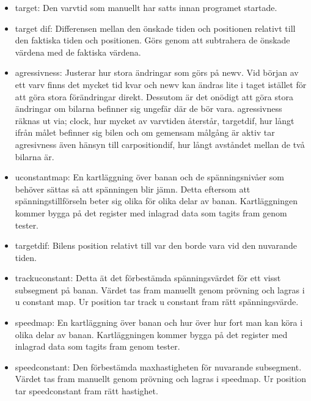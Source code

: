 \begin{itemize}
      \item target: Den varvtid som manuellt har satts innan programet startade.
      \item target dif: Differensen mellan den önskade tiden och positionen relativt till den faktiska tiden och positionen. Görs genom att subtrahera de önskade värdena med de faktiska värdena. 
 
      \item agressivness: Justerar hur stora ändringar som görs på new\textunderscore v. Vid början av ett varv finns det mycket tid kvar och new\textunderscore v kan ändras lite i taget istället för att göra stora förändringar direkt. Dessutom är det onödigt att göra stora ändringar om bilarna befinner sig ungefär där de bör vara. agressivness räknas ut via; clock,  hur mycket av varvtiden återstår, target\textunderscore dif, hur långt ifrån målet befinner sig bilen och om gemensam målgång är aktiv tar agresivness även hänsyn till car\textunderscore position\textunderscore dif,  hur långt avståndet mellan de två bilarna är. 

      \item u\textunderscore constant\textunderscore map: En kartläggning över banan och de spänningsnivåer som behöver sättas så att spänningen blir jämn. Detta eftersom att spänningstillförseln beter sig olika för olika delar av banan. Kartläggningen kommer bygga på det register med inlagrad data som tagits fram genom tester.
      \item target\textunderscore dif: Bilens position relativt till var den borde vara vid den nuvarande tiden.
      
\item track\textunderscore u\textunderscore constant: Detta ät det förbestämda spänningsvärdet för ett visst subsegment på banan. Värdet tas fram manuellt genom prövning och lagras i u \textunderscore constant \textunderscore map. Ur position tar track \textunderscore u \textunderscore constant fram rätt spänningsvärde. 
     
 \item speed\textunderscore map: En kartläggning över banan och hur över hur fort man kan köra i olika delar av banan. Kartläggningen kommer bygga på det register med inlagrad data som tagits fram genom tester.

      \item speed\textunderscore constant: Den förbestämda maxhastigheten för nuvarande subsegment. Värdet tas fram manuellt genom prövning och lagras i speed\textunderscore map. Ur position tar speed\textunderscore constant fram rätt hastighet. 


\end{itemize}
